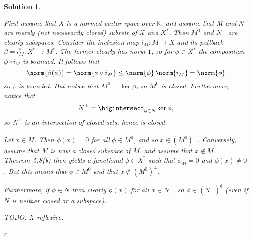 \documentclass[article, a4paper, 11pt, oneside]{memoir}
\numberwithin{equation}{chapter}
\newcommand{\bbK}{\mathbb{K}}
\theoremstyle{nonumberplain}
\newtheorem{solution}{Solution}
\begin{document}
\begin{solution}
\begin{solutionsec}
	\item First assume that $X$ is a normed vector space over $\bbK$, and assume that $M$ and $N$ are merely (not necessarily closed) \emph{subsets} of $X$ and $X^*$. Then $M^0$ and $N^\perp$ are clearly subspaces. Consider the inclusion map $i_M \colon M \to X$ and its pullback $\beta = i_M^* \colon X^* \to M^*$. The former clearly has norm $1$, so for $\phi \in X^*$ the composition $\phi \circ i_M$ is bounded. It follows that
	\begin{equation*}
		\norm{\beta(\phi)}
			= \norm{\phi \circ i_M}
			\leq \norm{\phi} \, \norm{i_M}
			= \norm{\phi}
	\end{equation*}
	so $\beta$ is bounded. But notice that $M^0 = \ker\beta$, so $M^0$ is closed. Furthermore, notice that
	\begin{equation*}
		N^\perp
			= \bigintersect_{\phi \in N} \ker\phi,
	\end{equation*}
	so $N^\perp$ is an intersection of closed sets, hence is closed.

	\item Let $x \in M$. Then $\phi(x) = 0$ for all $\phi \in M^0$, and so $x \in (M^0)^\perp$. Conversely, assume that $M$ is now a closed subspace of $M$, and assume that $x \not\in M$. Theorem~5.8(b) then yields a functional $\phi \in X^*$ such that $\phi_M = 0$ and $\phi(x) \neq 0$. But this means that $\phi \in M^0$ and that $x \not\in (M^0)^\perp$.

	Furthermore, if $\phi \in N$ then clearly $\phi(x)$ for all $x \in N^\perp$, so $\phi \in (N^\perp)^0$ (even if $N$ is neither closed or a subspace).
	
	TODO: $X$ reflexive.

	\item c


\end{solutionsec}
\end{solution}
\end{document}
